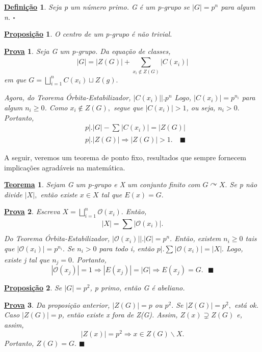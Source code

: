 \documentclass{article}
\newtheorem*{def*}{\underline{Defini\c c\~ao}}
\newtheorem*{prop*}{\underline{Proposi\c c\~ao}}
\newtheorem*{theorem*}{\underline{Teorema}}
\newtheorem*{proof*}{\underline{Prova}}
\renewcommand\qedsymbol{$\blacksquare$}
\begin{document}
\begin{def*}
  Seja p um número primo. G é um p-grupo se \(|G| = p^{n}\) para algum n. \(\square\)
\end{def*}
\begin{prop*}
  O centro de um p-grupo é não trivial.
\end{prop*}
\begin{proof*}
  Seja G um p-grupo. Da equa\c cão de classes, 
    \[
      |G| = |Z(G)| + \sum\limits_{x_{i}\not\in Z(G)}^{}|C(x_{i})|
    \]
  em que \(G = \bigsqcup_{i=1}^{n}{C(x_{i})}\sqcup Z(g).\) 

Agora, do Teorema Órbita-Estabilizador, \(|C(x_{i})|\biggl|\biggr. p^{n}\) Logo, 
 \(|C(x_{i})| = p^{n_{i}}\) para algum \(n_{i}\geq 0\). Como \(x_{i}\not\in Z(G),\) segue
 que \(|C(x_{i})| > 1\), ou seja, \(n_{i} > 0.\) Portanto, 
\begin{align*}
  &p\biggl|\biggr. |G| - \sum\limits_{}^{}|C(x_{i})| = |Z(G)|\\
  &p\biggl|\biggr. |Z(G)| \Rightarrow |Z(G)| > 1.\quad\text{\qedsymbol}
\end{align*}
\end{proof*}
  A seguir, veremos um teorema de ponto fixo, resultados que sempre fornecem implica\c cões
agradáveis na matemática.
\hypertarget{fixed_point}{
\begin{theorem*}
  Sejam G um p-grupo e X um conjunto finito com \(G \curvearrowright X.\) Se p
não divide \(|X|,\) então existe \(x\in X\) tal que \(E(x) = G.\)
\end{theorem*}}
\begin{proof*}
  Escreva \(X = \bigsqcup_{i=1}^{n}{\mathcal{O}(x_{i}).}\) Então, 
    \[
      |X| = \sum\limits_{}^{}|\mathcal{O}(x_{i})|.
    \]
  Do Teorema Órbita-Estabilizador, \(|\mathcal{O}(x_{i})|\biggl|\biggr. |G|= p^{n}.\)
  Então, existem \(n_{i}\geq 0\) tais que \(|\mathcal{O}(x_{i})| = p^{n_{i}}.\)
  Se \(n_{i} > 0\) para todo i, então \(p\bigl|\bigr. \sum\limits_{}^{}|\mathcal{O}(x_{i})| = |X|.\)
  Logo, existe j tal que \(n_{j}=0\). Portanto, 
    \[
      |\mathcal{O}(x_{j})| = 1 \Rightarrow |E(x_{j})| = |G| \Rightarrow E(x_{j}) = G.\text{ \qedsymbol}
    \]
\end{proof*}
\begin{prop*}
  Se \(|G| = p^{2}\), p primo, então G é abeliano.
\end{prop*}
\begin{proof*}
  Da proposi\c cão anterior, \(|Z(G)| = p\) ou \(p^{2}.\) Se \(|Z(G)|=p^{2},\) está ok.
Caso \(|Z(G)| = p\), então existe x fora de Z(G). Assim, \(Z(x)\supsetneq{Z(G)}\) e, assim, 
  \[
    |Z(x)| = p^{2} \Rightarrow x\in Z(G)\backslash X.
  \]
  Portanto, \(Z(G) = G.\) \qedsymbol
\end{proof*}
\end{document}

